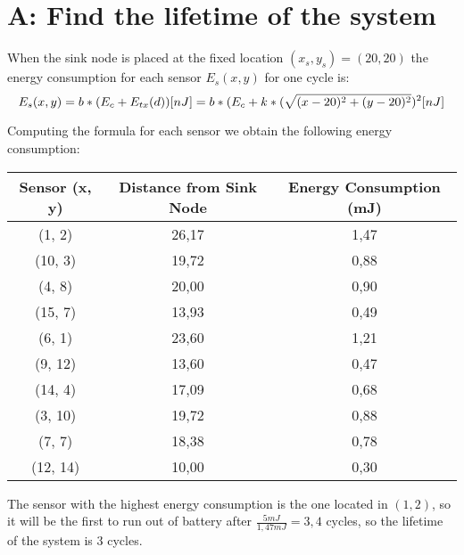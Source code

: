 \documentclass{Configuration_Files/PoliMi3i_thesis}
\begin{document}
\mainmatter %


\chapter{A: Find the lifetime of the system}

When the sink node is placed at the fixed location $(x_s, y_s)=(20,20)$ the energy consumption for each sensor $E_s(x,y)$ for one cycle is:
\begin{equation}
E_s(x,y)=b*(E_c+E_{tx}(d)) \space [nJ]= b*(E_c+k*(\sqrt{(x-20)^2+(y-20)^2})^2 \space [nJ]
\end{equation}

Computing the formula for each sensor we obtain the following energy consumption:

\begin{table}[h]
    \centering
    \begin{tabular}{c c c}
        \toprule
        \textbf{Sensor (x, y)} & \textbf{Distance from Sink Node} & \textbf{Energy Consumption (mJ)} \\
        \midrule
        (1, 2)   & 26,17  & 1,47 \\
        (10, 3)  & 19,72  & 0,88 \\
        (4, 8)   & 20,00  & 0,90 \\
        (15, 7)  & 13,93  & 0,49 \\
        (6, 1)   & 23,60  & 1,21 \\
        (9, 12)  & 13,60  & 0,47 \\
        (14, 4)  & 17,09  & 0,68 \\
        (3, 10)  & 19,72  & 0,88 \\
        (7, 7)   & 18,38  & 0,78 \\
        (12, 14) & 10,00  & 0,30 \\
        \bottomrule
    \end{tabular}
\end{table}

The sensor with the highest energy consumption is the one located in $(1,2)$, so it will be the first to run out of battery after $\frac{5mJ}{1,47mJ}=3,4$ cycles, so the lifetime of the system is 3 cycles.
\end{document}
